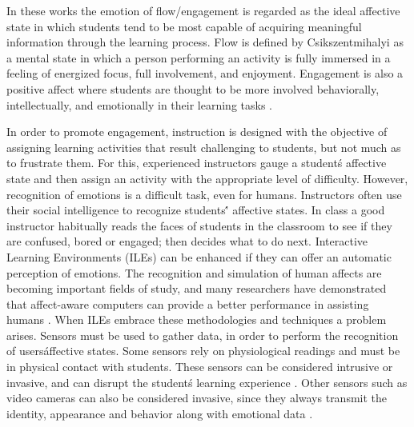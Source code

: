 \documentclass[a4paper,twoside]{article}
\begin{document}
In these works the emotion of flow/engagement is regarded as the ideal affective state in which
students tend to be most capable of acquiring meaningful information through the
learning process. Flow is defined by Csikszentmihalyi \cite{csikszentmihalyi1990flow}
as a mental state in which a person performing an activity is fully immersed in a feeling of
energized focus, full involvement, and enjoyment. Engagement is also a positive
affect where students are thought to be more involved behaviorally,
intellectually, and emotionally in their learning tasks \cite{bangert2002teacher}.

In order to promote engagement, instruction is designed with the
objective of assigning learning activities
that result challenging to students, but not much as to frustrate them. For
this, experienced instructors gauge a student\'s affective state and then assign
an activity with the appropriate level of difficulty. However, recognition of 
emotions is a difficult task, even
for humans. Instructors often use their social intelligence to recognize
students\'' affective states. In class a good instructor habitually reads the
faces of students in the classroom to see if they are confused, bored or
engaged; then decides what to do next. Interactive Learning Environments (ILEs)
can be enhanced if they can offer an
automatic perception of emotions. The recognition and simulation of human
affects are becoming important fields of study, and many researchers have
demonstrated that affect-aware computers can provide a better performance in assisting
humans \cite{picard2001toward}. When ILEs embrace these methodologies and techniques a
problem arises. Sensors must be used to gather data, in order to perform the 
recognition of users\' affective states. Some sensors rely on physiological readings
and must be in physical contact with students. These sensors can be considered
intrusive or invasive, and can disrupt the student\'s learning experience 
\cite{zhai2008stress, sidney2005integrating, arroyo2009emotion}.
Other sensors such as video cameras can also be considered invasive, since they always transmit the
identity, appearance and behavior along with emotional data \cite{picard2001toward}.
\end{document}

